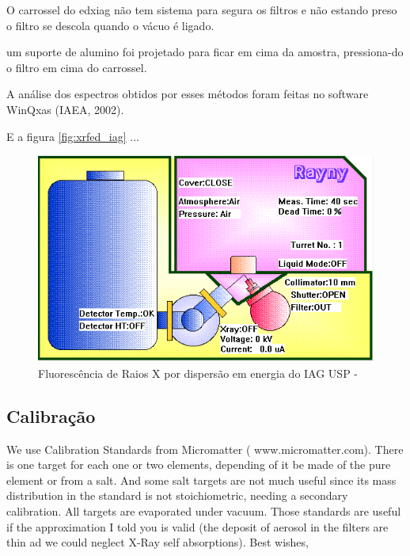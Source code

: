 O carrossel do edxiag não tem sistema para segura os filtros e
não estando preso o filtro se descola quando o vácuo é ligado. 

um suporte de alumino foi projetado para ficar em cima da amostra, pressiona-do o filtro
em cima do carrossel.



A análise dos espectros obtidos por esses métodos foram feitas no software WinQxas (IAEA, 2002).


E a figura \ref{fig:xrfed_iag} ...

\begin{figure}[H]
\begin{center}
  \includegraphics[scale=0.4]{../inputs/images/edx_iag_monitor.png}
  \caption{Fluorescência de Raios X por dispersão em energia do IAG USP - \label{fig:xrfed_software}}
\end{center}
\end{figure}

\subsection{Calibração}


We use Calibration
Standards from Micromatter ( www.micromatter.com).
There is one target for each one or two elements,
depending of it be made of the pure element or
from a salt. And some salt targets are not much
useful since its mass distribution in the
standard is not stoichiometric, needing a
secondary calibration. All targets are evaporated
under vacuum. Those standards are useful if the
approximation I told you is valid (the deposit of
aerosol in the filters are thin ad we could neglect X-Ray self absorptions).
Best wishes,

